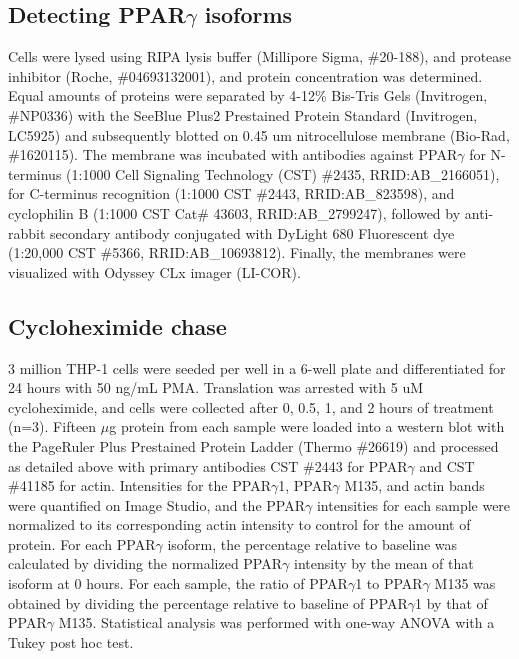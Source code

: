 \subsection{Detecting PPAR\texorpdfstring{$\gamma$}{gamma} isoforms}
Cells were lysed using RIPA lysis buffer (Millipore Sigma, \#20-188), and protease inhibitor (Roche, \#04693132001), and protein concentration was determined. Equal amounts of proteins were separated by 4-12\% Bis-Tris Gels (Invitrogen, \#NP0336) with the SeeBlue Plus2 Prestained Protein Standard (Invitrogen, LC5925) and subsequently blotted on 0.45 um nitrocellulose membrane (Bio-Rad, \#1620115). The membrane was incubated with antibodies against PPAR$\gamma$ for N-terminus (1:1000 Cell Signaling Technology (CST) \#2435, RRID:AB\_2166051), for C-terminus recognition (1:1000 CST \#2443, RRID:AB\_823598), and cyclophilin B (1:1000 CST Cat\# 43603, RRID:AB\_2799247), followed by anti-rabbit secondary antibody conjugated with DyLight 680 Fluorescent dye (1:20,000 CST \#5366, RRID:AB\_10693812). Finally, the membranes were visualized with Odyssey CLx imager (LI-COR).

\subsection{Cycloheximide chase}
3 million THP-1 cells were seeded per well in a 6-well plate and differentiated for 24 hours with 50 ng/mL PMA. Translation was arrested with 5 uM cycloheximide, and cells were collected after 0, 0.5, 1, and 2 hours of treatment (n=3). Fifteen $\mu$g protein from each sample were loaded into a western blot with the PageRuler Plus Prestained Protein Ladder (Thermo \#26619) and processed as detailed above with primary antibodies CST \#2443 for PPAR$\gamma$ and CST \#41185 for actin. Intensities for the PPAR$\gamma$1, PPAR$\gamma$ M135, and actin bands were quantified on Image Studio, and the PPAR$\gamma$ intensities for each sample were normalized to its corresponding actin intensity to control for the amount of protein. For each PPAR$\gamma$ isoform, the percentage relative to baseline was calculated by dividing the normalized PPAR$\gamma$ intensity by the mean of that isoform at 0 hours. For each sample, the ratio of PPAR$\gamma$1 to PPAR$\gamma$ M135 was obtained by dividing the percentage relative to baseline of PPAR$\gamma$1 by that of PPAR$\gamma$ M135. Statistical analysis was performed with one-way ANOVA with a Tukey post hoc test.

